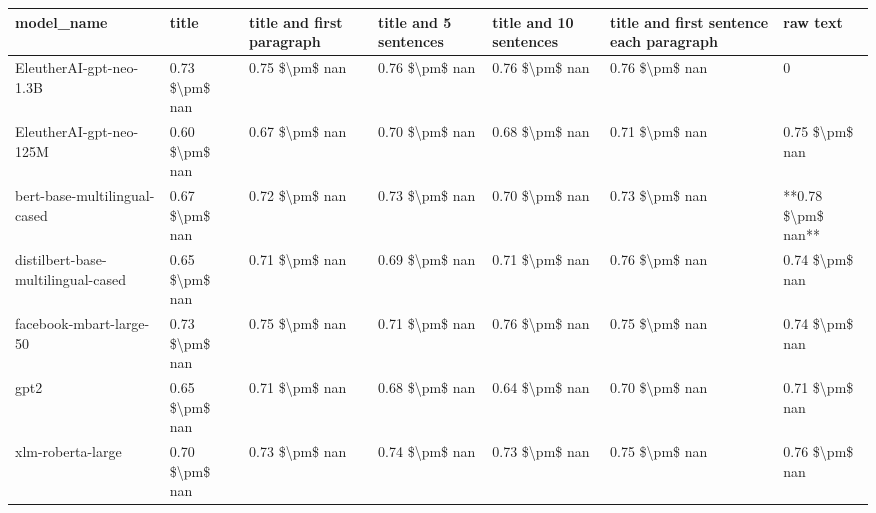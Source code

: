 \begin{tabular}{lllllll}
\toprule
                        model\_name &          title & title and first paragraph & title and 5 sentences & title and 10 sentences & title and first sentence each paragraph &           raw text \\
\midrule
           EleutherAI-gpt-neo-1.3B & 0.73 \$\textbackslash pm\$ nan &            0.75 \$\textbackslash pm\$ nan &        0.76 \$\textbackslash pm\$ nan &         0.76 \$\textbackslash pm\$ nan &                          0.76 \$\textbackslash pm\$ nan &                  0 \\
           EleutherAI-gpt-neo-125M & 0.60 \$\textbackslash pm\$ nan &            0.67 \$\textbackslash pm\$ nan &        0.70 \$\textbackslash pm\$ nan &         0.68 \$\textbackslash pm\$ nan &                          0.71 \$\textbackslash pm\$ nan &     0.75 \$\textbackslash pm\$ nan \\
      bert-base-multilingual-cased & 0.67 \$\textbackslash pm\$ nan &            0.72 \$\textbackslash pm\$ nan &        0.73 \$\textbackslash pm\$ nan &         0.70 \$\textbackslash pm\$ nan &                          0.73 \$\textbackslash pm\$ nan & **0.78 \$\textbackslash pm\$ nan** \\
distilbert-base-multilingual-cased & 0.65 \$\textbackslash pm\$ nan &            0.71 \$\textbackslash pm\$ nan &        0.69 \$\textbackslash pm\$ nan &         0.71 \$\textbackslash pm\$ nan &                          0.76 \$\textbackslash pm\$ nan &     0.74 \$\textbackslash pm\$ nan \\
           facebook-mbart-large-50 & 0.73 \$\textbackslash pm\$ nan &            0.75 \$\textbackslash pm\$ nan &        0.71 \$\textbackslash pm\$ nan &         0.76 \$\textbackslash pm\$ nan &                          0.75 \$\textbackslash pm\$ nan &     0.74 \$\textbackslash pm\$ nan \\
                              gpt2 & 0.65 \$\textbackslash pm\$ nan &            0.71 \$\textbackslash pm\$ nan &        0.68 \$\textbackslash pm\$ nan &         0.64 \$\textbackslash pm\$ nan &                          0.70 \$\textbackslash pm\$ nan &     0.71 \$\textbackslash pm\$ nan \\
                 xlm-roberta-large & 0.70 \$\textbackslash pm\$ nan &            0.73 \$\textbackslash pm\$ nan &        0.74 \$\textbackslash pm\$ nan &         0.73 \$\textbackslash pm\$ nan &                          0.75 \$\textbackslash pm\$ nan &     0.76 \$\textbackslash pm\$ nan \\
\bottomrule
\end{tabular}

